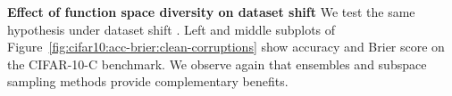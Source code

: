 \documentclass{article}
\begin{document}
%
%
%
%
%
%
%
%
%
%

%
%
%
%
%
%
%
%
%
%
%
%
%



%
%
%
%
%
%
%
%

%
%
%
%
%
%
%
%
%
%
%
%
%
%
%
%
%
%
%
%
%
%
%
%
%
%

%
%
%
%
%
%
%
%
%
%
%
%
%
%
%
%
%
%
%
%
%
%
%







%
\textbf{Effect of function space diversity on dataset shift} 
%
%
%
We test the same hypothesis under dataset shift \citep{ovadia2019can,hendrycks2018benchmarking}.
Left and middle subplots of  Figure~\ref{fig:cifar10:acc-brier:clean-corruptions}
show accuracy and Brier score  on the CIFAR-10-C benchmark. We observe again that ensembles and subspace sampling methods provide complementary benefits. 
\end{document}
